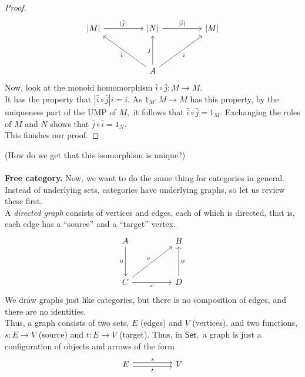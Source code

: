 \begin{proof}
\begin{equation*}
\begin{tikzcd}
{\vert}M{\vert} \arrow[rr, "{\vert}\bar{j}{\vert}"] &  & {\vert}N{\vert} \arrow[rr, "{\vert}\bar{i}{\vert}"]    &  & {\vert}M{\vert} \\
                                                    &  &                                                        &  &                 \\
                                                    &  & A \arrow[uu, "j"] \arrow[rruu, "i"'] \arrow[lluu, "i"] &  &                
\end{tikzcd}
	\end{equation*}
	Now, look at the monoid homomorphism $\bar{i}\circ\bar{j}:M\to M.$\\
	It has the property that $|\bar{i}\circ\bar{j}|i = i.$ As $1_M:M\to M$ has this property, by the uniqueness part of the UMP of $M,$ it follows that $\bar{i}\circ\bar{j} = 1_M.$ Exchanging the roles of $M$ and $N$ shows that $\bar{j}\circ\bar{i} = 1_N.$\\
	This finishes our proof.
\end{proof}
(How do we get that this isomorphism is unique?)\\~\\
\textbf{Free category.} Now, we want to do the same thing for categories in general. Instead of underlying sets, categories have underlying graphs, so let us review these first.\\
A \emph{directed graph} consists of vertices and edges, each of which is directed, that is, each edge has a ``source'' and a ``target'' vertex.
\begin{equation*} 
	\begin{tikzcd}
A \arrow[dd, "u"']                   &  & B                  \\
                                     &  &                    \\
C \arrow[rr, "x"'] \arrow[rruu, "v"] &  & D \arrow[uu, "w"']
\end{tikzcd}
\end{equation*}
We draw graphs just like categories, but there is no composition of edges, and there are no identities.\\
Thus, a graph consists of two sets, $E$ (edges) and $V$ (vertices), and two functions, $s:E\to V$ (source) and $t:E\to V$ (target). Thus, in $\mathsf{Set},$ a graph is just a configuration of objects and arrows of the form
\begin{equation*} 
	\begin{tikzcd}
		E \arrow[rr, "t"', shift right] \arrow[rr, "s", shift left] &  & V
	\end{tikzcd}
\end{equation*}
